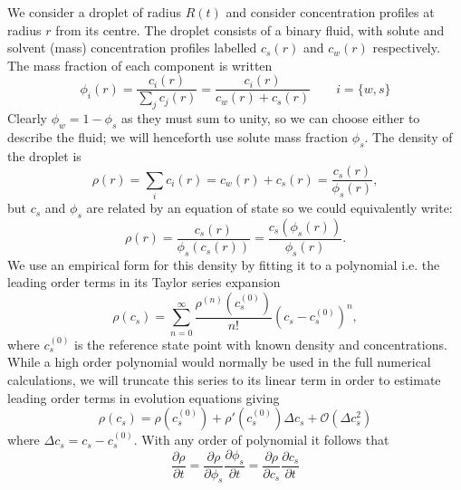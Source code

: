 \documentclass[12pt]{report}
\begin{document}
We consider a droplet of radius $R(t)$ and consider concentration profiles at radius $r$ from its centre.
The droplet consists of a binary fluid, with solute and solvent (mass) concentration profiles labelled $c_s(r)$ and $c_w(r)$ respectively.
The mass fraction of each component is written
\begin{equation}\label{eq:mass-fraction}
  \phi_i(r) = \frac{c_i(r)}{\sum_j c_j(r)} = \frac{c_i(r)}{c_w(r) + c_s(r)} \qquad i=\{w,s\}
\end{equation}
Clearly $\phi_w = 1 - \phi_s$ as they must sum to unity, so we can choose either to describe the fluid;
we will henceforth use solute mass fraction $\phi_s$.
The density of the droplet is
\begin{equation}
  \rho(r) = \sum_i c_i(r) = c_w(r) + c_s(r) = \frac{c_s(r)}{\phi_s(r)},
\end{equation}
but $c_s$ and $\phi_s$ are related by an equation of state so we could equivalently write:
\begin{equation}
  \rho(r) = \frac{c_s(r)}{\phi_s(c_s(r))} = \frac{c_s(\phi_s(r))}{\phi_s(r)}.
\end{equation}
We use an empirical form for this density by fitting it to a polynomial i.e. the leading order terms in its Taylor series expansion
\begin{equation}
  \rho(c_s) = \sum_{n=0}^{\infty} \frac{\rho^{(n)}(c_s^{(0)})}{n!} (c_s - c_s^{(0)})^n,
\end{equation}
where $c_s^{(0)}$ is the reference state point with known density and concentrations.
While a high order polynomial would normally be used in the full numerical calculations, we will
truncate this series to its linear term in order to estimate leading order terms in evolution
equations giving
\begin{equation}\label{eq:density-expansion}
  \rho(c_s) = \rho(c_s^{(0)}) + \rho'(c_s^{(0)}) \Delta c_s + \mathcal{O}(\Delta c_s^2)
\end{equation}
where $\Delta c_s = c_s - c_s^{(0)}$.
With any order of polynomial it follows that
\begin{equation}\label{eq:linear-density-regime}
  \frac{\partial \rho}{\partial t}
  = \frac{\partial \rho}{\partial \phi_s} \frac{\partial \phi_s}{\partial t}
  = \frac{\partial \rho}{\partial c_s} \frac{\partial c_s}{\partial t}
\end{equation}
\end{document}
